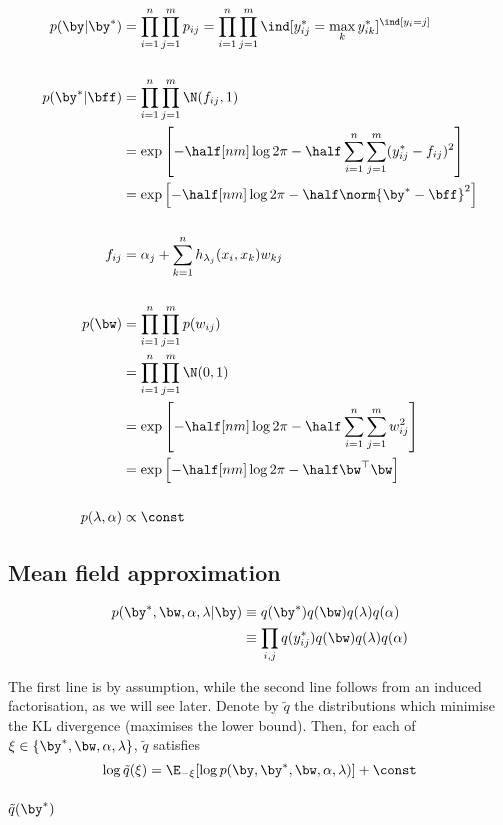 \documentclass[]{article}
\begin{document}
\begin{align*}
  p(\by|\by^*) &= \prod_{i=1}^n \prod_{j=1}^m p_{ij} 
  = \prod_{i=1}^n \prod_{j=1}^m \ind[y_{ij}^* = \max_k y_{ik}^*]^{\ind[y_i = j]} \\
  \\
  p(\by^*|\bff) &= \prod_{i=1}^n \prod_{j=1}^m \N(f_{ij},1) \\
  &= \exp \left[-\half[nm]\log 2\pi - \half \sum_{i=1}^n \sum_{j=1}^m (y_{ij}^* - f_{ij})^2 \right] \\
  &= \exp \left[-\half[nm]\log 2\pi - \half \norm{\by^* - \bff}^2 \right] \\
  \\
  f_{ij} &= \alpha_j + \sum_{k=1}^n  h_{\lambda_j}(x_i, x_k)w_{kj} \\
  \\
  p(\bw) &= \prod_{i=1}^n \prod_{j=1}^m p(w_{ij}) \\
  &= \prod_{i=1}^n \prod_{j=1}^m \N(0,1) \\
  &= \exp \left[-\half[nm]\log 2\pi - \half \sum_{i=1}^n \sum_{j=1}^m w_{ij}^2 \right] \\
  &= \exp \left[-\half[nm]\log 2\pi - \half \bw^\top \bw \right] \\
  \\
p(\lambda,\alpha) &\propto \const  
\end{align*}

\subsection{Mean field approximation}

\begin{align*}
  p(\by^*, \bw, \alpha, \lambda | \by) 
  &\equiv q(\by^*)q(\bw)q(\lambda)q(\alpha) \\
  &\equiv \prod_{i,j} q(y_{ij}^*)q(\bw)q(\lambda)q(\alpha)
\end{align*}

The first line is by assumption, while the second line follows from an induced factorisation, as we will see later. Denote by $\tilde q$ the distributions which minimise the KL divergence (maximises the lower bound). Then, for each of $\xi \in \{ \by^*, \bw, \alpha, \lambda \}$, $\tilde q$ satisfies
\[
  \log \tilde q(\xi) = \E_{-\xi} [\log p(\by, \by^*, \bw, \alpha, \lambda)] + \const
\]

\subsubsection{$\tilde q(\by^*)$}
\end{document}
